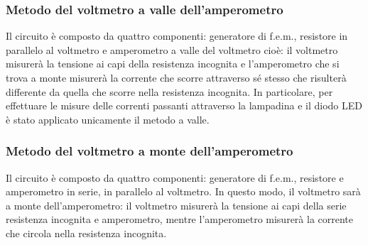 \documentclass{article}
\begin{document}
\subsubsection{Metodo del voltmetro a valle dell’amperometro}
Il circuito è composto da quattro componenti: generatore di f.e.m., resistore in
parallelo al voltmetro e amperometro a valle del voltmetro cioè: il voltmetro
misurerà la tensione ai capi della resistenza incognita e l’amperometro che si
trova a monte misurerà la corrente che scorre attraverso sé stesso che risulterà
differente da quella che scorre nella resistenza incognita. In particolare, per
effettuare le misure delle correnti passanti attraverso la lampadina e il diodo
LED è stato applicato unicamente il metodo a valle.
\subsubsection{Metodo del voltmetro a monte dell’amperometro}
Il circuito è composto da quattro componenti: generatore di f.e.m., resistore e
amperometro in serie, in parallelo al voltmetro. In questo modo, il voltmetro
sarà a monte dell’amperometro: il voltmetro misurerà la tensione ai capi della serie resistenza incognita e amperometro, mentre l’amperometro misurerà la
corrente che circola nella resistenza incognita.
\end{document}
